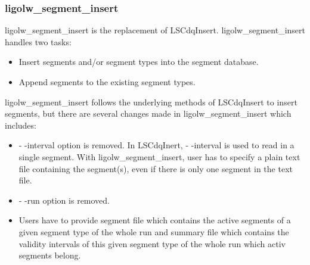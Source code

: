 \subsubsection{ligolw\_segment\_insert}
ligolw\_segment\_insert is the replacement of LSCdqInsert. ligolw\_segment\_insert handles two tasks:
\begin{itemize}
\item Insert segments and/or segment types into the segment database.
\item Append segments to the existing segment types.
\end{itemize}
ligolw\_segment\_insert follows the underlying methods of LSCdqInsert to insert segments, but there are several changes made in ligolw\_segment\_insert which includes:
\begin{itemize}
\item - -interval option is removed. In LSCdqInert, - -interval is used to read in a single segment. With ligolw\_segment\_insert, user has to specify a plain text file containing the segment(s), even if there is only one segment in the text file.
\item - -run option is removed.
\item Users have to provide segment file which contains the active segments of a given segment type of the whole run and summary file which contains the validity intervals of this given segment type of the whole run which activ segments belong.
\end{itemize}

